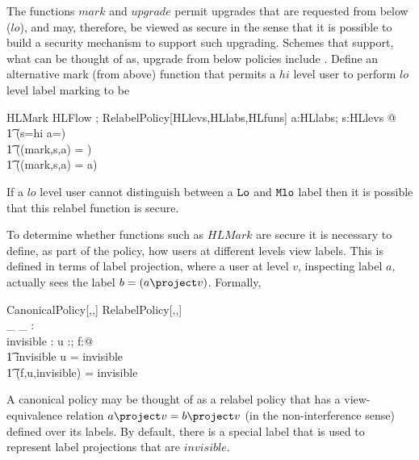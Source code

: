 \begin{ex} \label{x:hilo-scup}
The functions $mark$ and $upgrade$ permit  upgrades that are requested 
from below ($lo$), and may, therefore, be viewed as  secure in the sense that 
it is possible to build a security mechanism to support such upgrading.
Schemes that support, what can be thought of as, 
upgrade from below policies include  \cite{jajodia,Weissman:69,sword}. 
Define an alternative mark (from above) function that permits a $hi$ level
user to perform $lo$ level label marking to be
\begin{schema}{HLMark}
HLFlow ; RelabelPolicy[HLlevs,HLlabs,HLfuns]
\where
\forall a:HLlabs; s:HLlevs @ \\
\t1 \IF (s=hi \land a=\lo) \\
\t1 \THEN (\Rfun(mark,s,a) = \mlo) \\
\t1 \ELSE (\Rfun(mark,s,a) = a)
\end{schema}
If a $lo$ level user cannot distinguish between a $\mbox{\tt Lo}$ and $\mbox{\tt Mlo}$ label
then it is possible that this relabel  function is secure. 
\end{ex}

To determine whether functions such as $HLMark$ are secure it is 
necessary to define, as part of the policy, how users at different
levels view labels. This is defined in terms of label projection, 
where a user at level $v$, inspecting label $a$, actually 
sees the label  $b=(a\lproj v)$. 
Formally,  

\begin{schema}{CanonicalPolicy[\LEVEL,\LABEL,\FID]}
RelabelPolicy[\LEVEL,\LABEL,\FID] \\
\_ \lproj \_ : \LABEL \cross \LEVEL \fun \LABEL\\
invisible : \LABEL
\where
\forall u :\LEVEL; f:\FID @ \\
\t1 invisible \lproj u = invisible \land \\
\t1 \Rfun(f,u,invisible) = invisible
\end{schema}
A canonical policy may be thought of as a relabel policy that has a
view-equivalence relation $a\lproj v = b\lproj v$
(in the non-interference sense) defined over
its labels. By default, there is a special label that is used to
represent label projections that are $invisible$.

